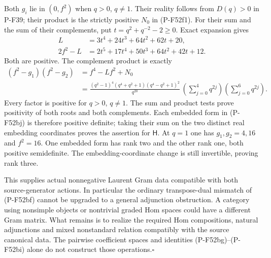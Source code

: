 Both $g_i$ lie in $(0,f^2)$ when $q>0$, $q\ne1$.
Their reality follows from $D(q)>0$ in P-F39; their
product is the strictly positive $N_0$ in (P-F52f1).
For their sum and the sum of their complements, put
$t=q^2+q^{-2}-2\ge0$. Exact expansion gives
\[
 \begin{split}
 L&=3t^4+24t^3+64t^2+62t+20,\\
 2f^2-L&=2t^5+17t^4+50t^3+64t^2+42t+12.
 \end{split}                                                    \tag{P-F52bk}
\]
Both are positive. The complement product is exactly
\[
 \begin{split}
 (f^2-g_1)(f^2-g_2)
 &=f^4-Lf^2+N_0\\
 &=\frac{(q^2-1)^4(q^4+q^2+1)(q^4-q^2+1)^2}{q^{20}}\,
       \left(\sum_{j=0}^4q^{2j}\right)
       \left(\sum_{j=0}^6q^{2j}\right).
 \end{split}                                                    \tag{P-F52bl}
\]
Every factor is positive for $q>0$, $q\ne1$.
The sum and product tests prove positivity of both
roots and both complements. Each embedded form in
(P-F52bj) is therefore positive definite; taking their
sum on the two distinct real embedding coordinates
proves the assertion for $\mathsf H$.
At $q=1$ one has $g_1,g_2=4,16$ and $f^2=16$.
One embedded form has rank two and the other rank one,
both positive semidefinite. The embedding-coordinate
change is still invertible, proving rank three.

This supplies actual nonnegative Laurent Gram data
compatible with both source-generator actions.
In particular the ordinary transpose-dual mismatch of
(P-F52bf) cannot be upgraded to a general adjunction
obstruction. A category using nonsimple objects or
nontrivial graded Hom spaces could have a different
Gram matrix. What remains is to realize the required
Hom compositions, natural adjunctions and mixed
nonstandard relation compatibly with the source
canonical data. The pairwise coefficient spaces and
identities (P-F52bg)--(P-F52bi) alone do not construct
those operations.\hfill$\square$
